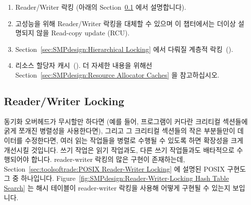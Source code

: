 \begin{enumerate}
\item	Reader/Writer 락킹
	(아래의 Section~\ref{sec:SMPdesign:Reader/Writer Locking} 에서
	설명합니다).
\item	고성능을 위해 Reader/Writer 락킹을 대체할 수 있으며 이 챕터에서는
	더이상 설명되지 않을 Read-copy update (RCU).
\item	Section~\ref{sec:SMPdesign:Hierarchical Locking} 에서 다뤄질 계층적
	락킹~(\cite{McKenney95b}).
\item	리소스 할당자 캐시~(\cite{McKenney95b,McKenney93}).
	더 자세한 내용을 위해선
	Section~\ref{sec:SMPdesign:Resource Allocator Caches} 을 참고하십시오.

\end{enumerate}

\subsection{Reader/Writer Locking}
\label{sec:SMPdesign:Reader/Writer Locking}

동기화 오버헤드가 무시할만 하다면 (예를 들어, 프로그램이 커다란 크리티컬
섹션들에 굵게 쪼개진 병렬성을 사용한다면), 그리고 그 크리티컬 섹션들의 작은
부분들만이 데이터를 수정한다면, 여러 읽는 작업들을 병렬로 수행될 수 있도록 하면
확장성을 크게 개선시킬 것입니다.
쓰기 작업은 읽기 작업과도, 다른 쓰기 작업들과도 배타적으로 수행되어야 합니다.
reader-writer 락킹의 많은 구현이 존재하는데,
Section~\ref{sec:toolsoftrade:POSIX Reader-Writer Locking} 에 설명된 POSIX
구현도 그 중 하나입니다.
Figure~\ref{fig:SMPdesign:Reader-Writer-Locking Hash Table Search} 는 해시
테이블이 reader-writer 락킹을 사용해 어떻게 구현될 수 있는지 보입니다.

